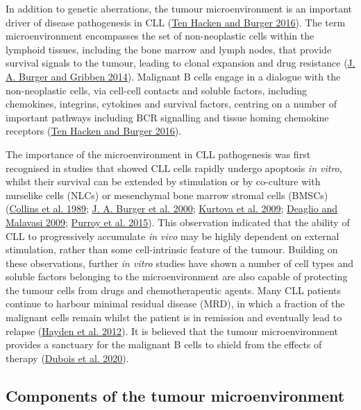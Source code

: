 \documentclass[11pt, a4paper, twosided]{book}
\begin{document}
In addition to genetic aberrations, the tumour microenvironment is an important driver of disease pathogenesis in CLL (\protect\hyperlink{ref-tenHacken2016}{Ten Hacken and Burger 2016}). The term microenvironment encompasses the set of non-neoplastic cells within the lymphoid tissues, including the bone marrow and lymph nodes, that provide survival signals to the tumour, leading to clonal expansion and drug resistance (\protect\hyperlink{ref-Burger2014}{J. A. Burger and Gribben 2014}). Malignant B cells engage in a dialogue with the non-neoplastic cells, via cell-cell contacts and soluble factors, including chemokines, integrins, cytokines and survival factors, centring on a number of important pathways including BCR signalling and tissue homing chemokine receptors (\protect\hyperlink{ref-tenHacken2016}{Ten Hacken and Burger 2016}).

The importance of the microenvironment in CLL pathogenesis was first recognised in studies that showed CLL cells rapidly undergo apoptosis \emph{in vitro}, whilst their survival can be extended by stimulation or by co-culture with nurselike cells (NLCs) or mesenchymal bone marrow stromal cells (BMSCs) (\protect\hyperlink{ref-Collins1989}{Collins et al. 1989}; \protect\hyperlink{ref-Burger2000}{J. A. Burger et al. 2000}; \protect\hyperlink{ref-Kurtova2009}{Kurtova et al. 2009}; \protect\hyperlink{ref-Deaglio2009}{Deaglio and Malavasi 2009}; \protect\hyperlink{ref-Purroy2015}{Purroy et al. 2015}). This observation indicated that the ability of CLL to progressively accumulate \emph{in vivo} may be highly dependent on external stimulation, rather than some cell-intrinsic feature of the tumour. Building on these observations, further \emph{in vitro} studies have shown a number of cell types and soluble factors belonging to the microenvironment are also capable of protecting the tumour cells from drugs and chemotherapeutic agents. Many CLL patients continue to harbour minimal residual disease (MRD), in which a fraction of the malignant cells remain whilst the patient is in remission and eventually lead to relapse (\protect\hyperlink{ref-Hayden2012}{Hayden et al. 2012}). It is believed that the tumour microenvironment provides a sanctuary for the malignant B cells to shield from the effects of therapy (\protect\hyperlink{ref-Dubois2020}{Dubois et al. 2020}).

\hypertarget{intro-TM-components}{%
\subsection{Components of the tumour microenvironment}\label{intro-TM-components}}
\end{document}
